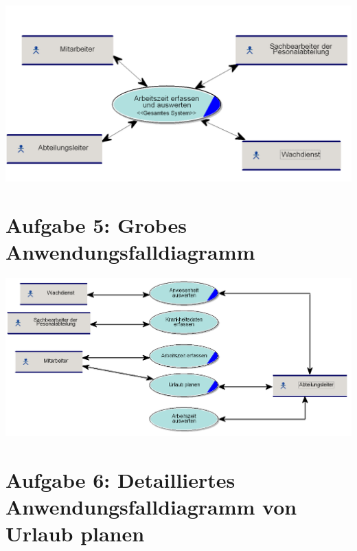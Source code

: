 \begin{center}
	\includegraphics[scale=0.4]{Kontextdiagramm.PNG}
\end{center}

\chapter*{Aufgabe 5: Grobes Anwendungsfalldiagramm}
\setcounter{section}{0}
\addtocounter{chapter}{1}

\begin{center}
	\includegraphics[width=0.9\linewidth]{GrobesAnwendungsfalldiagramm.PNG}
\end{center}


\chapter*{Aufgabe 6: Detailliertes Anwendungsfalldiagramm von Urlaub planen}
\setcounter{section}{0}
\addtocounter{chapter}{1}

